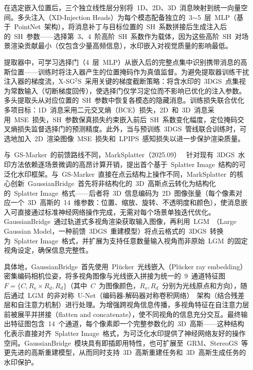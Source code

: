 在选定嵌入位置后，三个独立线性层分别将~1D、2D、3D~消息映射到统一向量空间。多头注入（XD-Injection Heads）为每个模态配备独立的~3$\sim$5~层~MLP（基于~PointNet~架构），将消息补丁与目标位置的~SH~系数拼接后生成注入后的~SH~参数——选择第~3、4~阶高阶~SH~系数作为载体，因为这些高阶~SH~对场景渲染贡献最小（仅包含少量高频信息），水印嵌入对视觉质量的影响最低。

提取器中，可学习选择门（4~层~MLP）从嵌入后的完整点集中识别携带消息的高斯位置——训练时将注入器产生的位置掩码作为真值监督。为避免提取器训练干扰注入器的梯度流，X-SG$^2$S~采用关键的梯度截断策略：将含水印的~3DGS~点集视为常数输入（切断梯度回传），使选择门仅学习定位而不影响已优化的注入参数。多头提取头从对应位置的~SH~参数中恢复各模态的隐藏消息。训练损失联合优化多项目标：1D~消息采用二元交叉熵（BCE）损失，2D~和~3D~消息采用~MSE~损失，SH~参数保真损失约束嵌入前后~SH~系数变化幅度，定位掩码交叉熵损失监督选择门的预测精度。此外，当与预训练~3DGS~管线联合训练时，可选地加入~2D~渲染图像~MSE~损失和~LPIPS~感知损失以进一步保护渲染质量。

与~GS-Marker~的前馈路线不同，MarkSplatter（2025.09）~\cite{2509_00757} 针对现有~3DGS~水印方法依赖逐场景微调的高昂计算开销，提出首个基于~Splatter Image~结构的可泛化水印框架。与~GS-Marker~直接在点云结构上操作不同，MarkSplatter~的核心创新~GaussianBridge~首先将非结构化的~3D~高斯点云转化为结构化的~Splatter Image~格式——后者将~3D~信息编码为~2D~图像张量（每个像素对应一个~3D~高斯的~14~维参数：位置、缩放、旋转、不透明度和颜色），使消息嵌入可直接通过标准神经网络操作完成，无需对每个场景单独迭代优化。GaussianBridge~通过轨道式多视角渲染获取输入图像，再利用~LGM~（Large Gaussian Model，一种前馈~3DGS~重建模型）将点云格式的~3DGS~转换为~Splatter Image~格式，并扩展为支持任意数量输入视角而非原始~LGM~的固定视角设定，确保信息完整性。

具体地，GaussianBridge~首先使用~Pl\"ucker~光线嵌入（Pl\"ucker ray embedding）密集编码相机位姿，将多视角图像与光线嵌入拼接为统一的~9~通道特征图~$F = \{C, R_o \times R_d, R_d\}$（其中~$C$~为图像颜色，$R_o, R_d$~分别为光线原点和方向），随后通过~LGM~的非对称~U-Net（编码器-解码器对称卷积网络）~架构（结合残差层和自注意力机制）进行处理。为增强跨视角信息传播，多视角特征在自注意力层前被展平并拼接（flatten and concatenate），使不同视角的信息充分交互。最终输出特征图包含~14~个通道，每个像素即一个完整参数化的~3D~高斯——这种结构化表示直接对齐~Splatter Image~格式，为可泛化水印提供了神经网络友好的操作空间。GaussianBridge~模块具有即插即用特性，也可扩展至~GRM、StereoGS~等更先进的高斯重建模型，从而同时支持~3D~高斯重建任务和~3D~高斯生成任务的水印保护。

